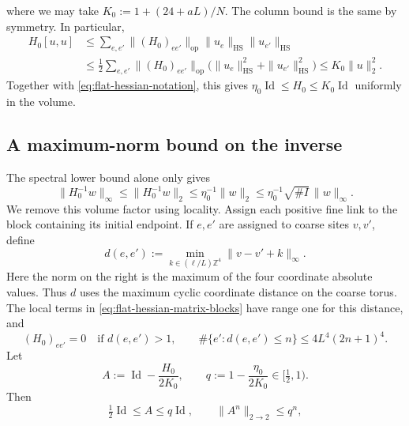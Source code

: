 \documentclass[10pt,reqno]{amsart}
\theoremstyle{definition}
\theoremstyle{remark}
\numberwithin{equation}{section}
\numberwithin{figure}{section}
\newcommand{\Z}{\mathbb Z}
\begin{document}
where we may take $K_0:=1+(24+aL)/N$. The column bound is the same
by symmetry. In particular,
\begin{equation}\label{eq:flat-hessian-upper-bound}
\begin{aligned}
H_0[u,u]
&\le\sum_{e,e'}\|(H_0)_{ee'}\|_{\mathrm{op}}
\|u_e\|_{\mathrm{HS}}\|u_{e'}\|_{\mathrm{HS}}\\
&\le\frac12\sum_{e,e'}\|(H_0)_{ee'}\|_{\mathrm{op}}
\bigl(\|u_e\|_{\mathrm{HS}}^2+\|u_{e'}\|_{\mathrm{HS}}^2\bigr)
\le K_0\|u\|_2^2.
\end{aligned}
\end{equation}
Together with \eqref{eq:flat-hessian-notation}, this gives
$\eta_0\operatorname{Id}\le H_0\le K_0\operatorname{Id}$ uniformly in the volume.

\subsection{A maximum-norm bound on the inverse}
The spectral lower bound alone only gives
\begin{equation}\label{eq:dimension-dependent-inverse-bound}
\|H_0^{-1}w\|_\infty\le\|H_0^{-1}w\|_2
\le\eta_0^{-1}\|w\|_2
\le\eta_0^{-1}\sqrt{\#I}\,\|w\|_\infty.
\end{equation}
We remove this volume factor using locality. Assign each positive fine
link to the block containing its initial endpoint. If $e,e'$ are
assigned to coarse sites $v,v'$, define
\begin{equation}\label{eq:coarse-link-distance}
d(e,e'):=\min_{k\in(\ell/L)\Z^4}\|v-v'+k\|_\infty.
\end{equation}
Here the norm on the right is the maximum of the four coordinate
absolute values. Thus $d$ uses the maximum cyclic coordinate distance
on the coarse torus. The local terms in \eqref{eq:flat-hessian-matrix-blocks}
have range one for this distance, and
\begin{equation}\label{eq:flat-hessian-range-and-growth}
(H_0)_{ee'}=0\quad\text{if }d(e,e')>1,\qquad
\#\{e':d(e,e')\le n\}\le4L^4(2n+1)^4.
\end{equation}
Let
\begin{equation}\label{eq:inverse-neumann-contraction}
A:=\operatorname{Id}-\frac{H_0}{2K_0},\qquad
q:=1-\frac{\eta_0}{2K_0}\in[\tfrac12,1).
\end{equation}
Then
\begin{equation}\label{eq:inverse-neumann-spectrum}
\tfrac12\operatorname{Id}\le A\le q\operatorname{Id},\qquad
\|A^n\|_{2\to2}\le q^n,
\end{equation}
\end{document}

